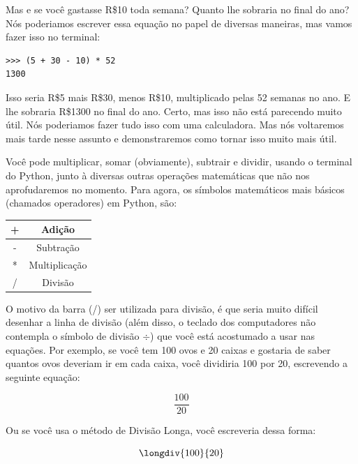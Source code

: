 Mas e se você gastasse R\$10 toda semana? Quanto lhe sobraria no final do ano? Nós poderiamos escrever essa equação no papel de diversas maneiras, mas vamos fazer isso no terminal:

\begin{listing}
\begin{verbatim}
>>> (5 + 30 - 10) * 52
1300
\end{verbatim}
\end{listing}

Isso seria R\$5 mais R\$30, menos R\$10, multiplicado pelas 52 semanas no ano. E lhe sobraria R\$1300 no final do ano. Certo, mas isso não está parecendo muito útil. Nós poderiamos fazer tudo isso com uma calculadora. Mas nós voltaremos mais tarde nesse assunto e demonstraremos como tornar isso muito mais útil.

Você pode multiplicar, somar (obviamente), subtrair e dividir, usando o terminal do Python, junto à diversas outras operações matemáticas que não nos aprofudaremos no momento. Para agora, os símbolos matemáticos mais básicos (chamados operadores) em Python, são:

\begin{center}
\begin{tabular}{|c|c|}
\hline
+ & Adição \\
\hline
- & Subtração \\
\hline
* & Multiplicação \\
\hline
/ & Divisão \\
\hline
\end{tabular}
\end{center}

O motivo da barra (/) ser utilizada para divisão, é que seria muito difícil desenhar a linha de divisão (além disso, o teclado dos computadores não contempla o símbolo de divisão $\div$) que você está acostumado a usar nas equações. Por exemplo, se você tem 100 ovos e 20 caixas e gostaria de saber quantos ovos deveriam ir em cada caixa, você dividiria 100 por 20, escrevendo a seguinte equação:

\begin{displaymath}
\frac{100}{20}
\end{displaymath}

Ou se você usa o método de Divisão Longa, você escreveria dessa forma:

\begin{displaymath}
\longdiv{100}{20}
\end{displaymath}

